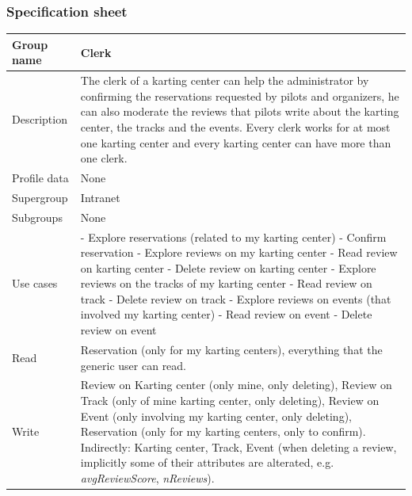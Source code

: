 \documentclass{beamer}
\begin{document}
\begin{frame}
    \frametitle{Specification sheet}
    \begin{table}
        \tiny
        \begin{tabular}{|p{2cm}|p{6cm}|}
        \hline
        Group name & \textbf{Clerk} \\
        \hline
        Description & The clerk of a karting center can help the administrator by confirming the reservations requested
        by pilots and organizers, he can also moderate the reviews that pilots write about the karting center, the tracks
        and the events. Every clerk works for at most one karting center and every karting center can have more than one clerk. \\
        \hline
        Profile data & None \\
        \hline
        Supergroup & Intranet \\
        \hline
        Subgroups & None \\
        \hline
        Use cases &
        - Explore reservations (related to my karting center) \newline
        - Confirm reservation \newline
        - Explore reviews on my karting center \newline
        - Read review on karting center \newline
        - Delete review on karting center\newline
        - Explore reviews on the tracks of my karting center \newline
        - Read review on track \newline
        - Delete review on track\newline
        - Explore reviews on events (that involved my karting center) \newline
        - Read review on event \newline
        - Delete review on event\\
        \hline
        Read & Reservation (only for my karting centers), everything 
        that the generic user can read. \\
        \hline
        Write & Review on Karting center (only mine, only deleting), Review on Track (only of mine karting center, only deleting), 
        Review on Event (only involving my karting center, only deleting), Reservation (only for my karting centers, only to confirm). \newline
        Indirectly: Karting center, Track, Event (when deleting a review, implicitly some of their 
        attributes are alterated, e.g. \textit{avgReviewScore}, \textit{nReviews}). \\
        \hline
        \end{tabular}
    \end{table}
\end{frame}
\end{document}

